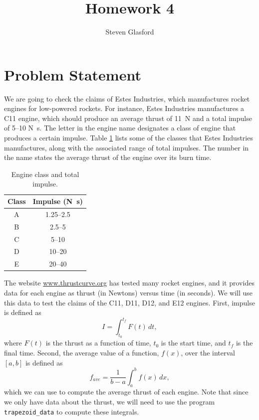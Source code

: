\documentclass[11pt]{article}
\title{Homework 4}
\author{Steven Glasford}
\date{\parbox{\linewidth}{\centering%
    \today\endgraf\medskip
    Numerical Analysis\endgraf\medskip
    MATH-373}}
\begin{document}
\maketitle
\pagebreak

\section{Problem Statement}
We are going to check the claims of Estes Industries, which manufactures rocket engines for low-powered rockets.  For instance, Estes Industries manufactures a C11 engine, which should produce an average thrust of \SI{11}{N} and a total impulse of 5--10 \si{N.s}.  The letter in the engine name designates a class of engine that produces a certain impulse.  Table \ref{table:estes} lists some of the classes that Estes Industries manufactures, along with the associated range of total impulses.  The number in the name states the average thrust of the engine over its burn time.

	\begin{table}[h]
	\begin{center}
	\caption{Engine class and total impulse.}\label{table:estes}
	\smallskip
	\begin{tabular}{c|c}
	Class & Impulse (\si{N.s})\\\hline
	A & 1.25--2.5\\
	B & 2.5--5\\
	C & 5--10\\
	D & 10--20\\
	E & 20--40\\
	\end{tabular}
	\end{center}
	\end{table}
	
The website \url{www.thrustcurve.org} has tested many rocket engines, and it provides data for each engine as thrust (in Newtons) versus time (in seconds).  We will use this data to test the claims of the C11, D11, D12, and E12 engines.  First, impulse is defined as $$I = \int_{t_0}^{t_f} F(t)\,dt,$$ where $F(t)$ is the thrust as a function of time, $t_0$ is the start time, and $t_f$ is the final time.  Second, the average value of a function, $f(x)$, over the interval $[a,b]$ is defined as $$f_{ave} = \frac{1}{b-a}\int_a^b f(x)\,dx,$$ which we can use to compute the average thrust of each engine.  Note that since we only have data about the thrust, we will need to use the program \texttt{trapezoid\_data} to compute these integrals.
\end{document}

